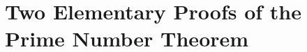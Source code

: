 \documentclass[elemannt.tex]{subfile}
\begin{document}
	\chapter{Two Elementary Proofs of the Prime Number Theorem}\label{ch:pnt}
\end{document}
